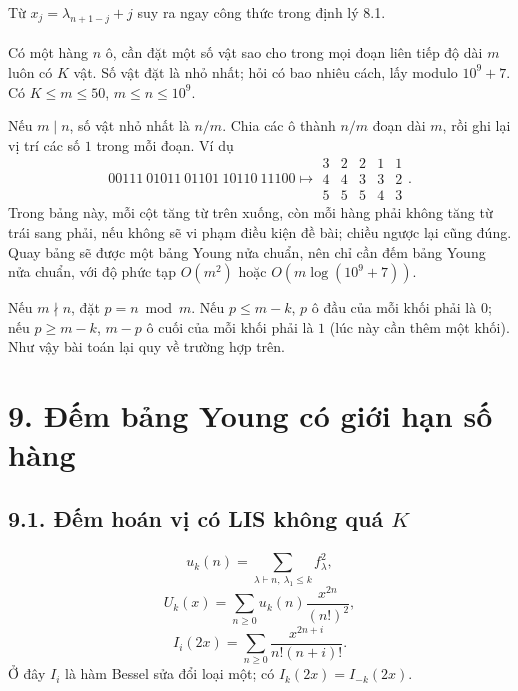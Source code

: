\documentclass[11pt]{article}
\begin{document}
Từ \(x_j=\lambda_{n+1-j}+j\) suy ra ngay công thức trong định lý 8.1.

\paragraph{}
Có một hàng \(n\) ô, cần đặt một số vật sao cho trong mọi đoạn liên tiếp độ
dài \(m\) luôn có \(K\) vật. Số vật đặt là nhỏ nhất; hỏi có bao nhiêu cách,
lấy modulo \(10^9+7\). Có \(K\le m\le50\), \(m\le n\le10^9\).

Nếu \(m\mid n\), số vật nhỏ nhất là \(n/m\). Chia các ô thành \(n/m\) đoạn
dài \(m\), rồi ghi lại vị trí các số \(1\) trong mỗi đoạn. Ví dụ
\[
00111\ 01011\ 01101\ 10110\ 11100
\longmapsto
\begin{array}{ccccc}
3&2&2&1&1\\
4&4&3&3&2\\
5&5&5&4&3
\end{array}.
\]
Trong bảng này, mỗi cột tăng từ trên xuống, còn mỗi hàng phải không tăng từ
trái sang phải, nếu không sẽ vi phạm điều kiện đề bài; chiều ngược lại cũng
đúng. Quay bảng sẽ được một bảng Young nửa chuẩn, nên chỉ cần đếm bảng Young
nửa chuẩn, với độ phức tạp \(O(m^2)\) hoặc \(O(m\log(10^9+7))\).

Nếu \(m\nmid n\), đặt \(p=n\bmod m\). Nếu \(p\le m-k\), \(p\) ô đầu của mỗi
khối phải là \(0\); nếu \(p\ge m-k\), \(m-p\) ô cuối của mỗi khối phải là
\(1\) (lúc này cần thêm một khối). Như vậy bài toán lại quy về trường hợp
trên.

\section*{9. Đếm bảng Young có giới hạn số hàng}

\subsection*{9.1. Đếm hoán vị có LIS không quá \(K\)}

\paragraph{}
\[
u_k(n)=\sum_{\lambda\vdash n,\ \lambda_1\le k} f_\lambda^2,
\tag{45}
\]
\[
U_k(x)=\sum_{n\ge0}u_k(n)\frac{x^{2n}}{(n!)^2},
\tag{46}
\]
\[
I_i(2x)=\sum_{n\ge0}\frac{x^{2n+i}}{n!(n+i)!}.
\tag{47}
\]
Ở đây \(I_i\) là hàm Bessel sửa đổi loại một; có \(I_k(2x)=I_{-k}(2x)\).
\end{document}
